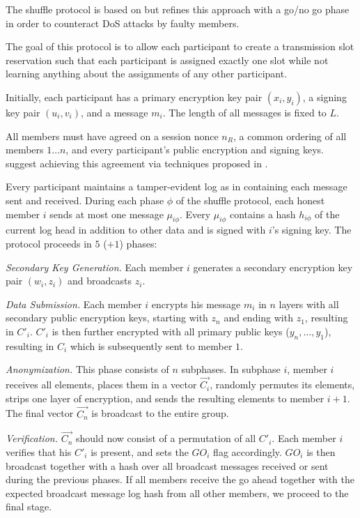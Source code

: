 The shuffle protocol is based on \cite{brickell2006efficient} but refines this approach
with a go/no go phase in order to counteract \ac{DoS} attacks by faulty members.

The goal of this protocol is to allow each participant to create a transmission slot reservation
such that each participant is assigned exactly one slot while not learning anything about
the assignments of any other participant.

Initially, each participant has a primary encryption key pair $(x_i, y_i)$, a signing key pair
$(u_i, v_i)$, and a message $m_i$. The length of all messages is fixed to $L$.

All members must have agreed on a session nonce $n_R$, a common ordering of all members
$1 \ldots n$, and every participant's public encryption and signing keys. \citeauthor{journals/corr/abs-1004-3057} suggest achieving this agreement via techniques
proposed in \cite{lamport1998part,castro1999practical}.

Every participant maintains a tamper-evident log as in \cite{haeberlen2007peerreview}
containing each message sent and received. During each phase $\phi$ of the shuffle protocol,
each honest member $i$ sends at most one message $\mu_{i\phi}$.
Every $\mu_{i\phi}$ contains a hash $h_{i\phi}$ of the current log head in addition to other data
and is signed with $i$'s signing key. The protocol proceeds in $5$ ($ + 1$) phases:

\emph{Secondary Key Generation.}
      Each member $i$ generates a secondary encryption key pair $(w_i, z_i)$ and broadcasts $z_i$.
      
\emph{Data Submission.}
      Each member $i$ encrypts his message $m_i$ in $n$ layers with all secondary public encryption keys,
      starting with $z_n$ and ending with $z_1$, resulting in $C'_i$.  $C'_i$ is then further encrypted
      with all primary public keys ($y_n, \ldots, y_1$), resulting in $C_i$ which is subsequently
      sent to member $1$. 
      
\emph{Anonymization.}
      This phase consists of $n$ subphases. In subphase $i$, member $i$ receives all elements,
      places them in a vector $\vec{C_i}$, randomly permutes its elements, strips one layer of
      encryption, and sends the resulting elements to member $i + 1$. The final vector $\vec{C_n}$
      is broadcast to the entire group.
      
\emph{Verification.}
      $\vec{C_n}$ should now consist of a permutation of all $C'_i$. Each member $i$ verifies that
      his $C'_i$ is present, and sets the $GO_i$ flag accordingly. $GO_i$ is then broadcast
      together with a hash over all broadcast messages received or sent during the previous phases.
      If all members receive the go ahead together with the expected broadcast message log hash
      from all other members, we proceed to the final stage.
      
